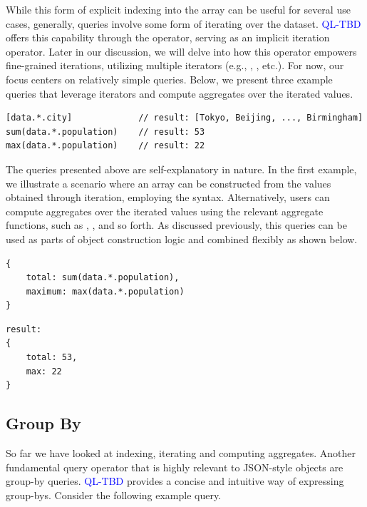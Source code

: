 \documentclass[runningheads]{llncs}
\newcommand{\lang}{\textcolor{blue}{QL-TBD}}
\begin{document}
While this form of explicit indexing into the array can be useful for several
use cases, generally, queries involve some form of iterating over the dataset.
\lang{} offers this capability through the \inline{*} operator,
serving as an implicit iteration operator.
Later in our discussion, we will delve into how this operator empowers fine-grained
iterations, utilizing multiple iterators
(e.g., , , etc.).
For now, our focus centers on relatively simple queries.
Below, we present three example queries that leverage iterators and compute
aggregates over the iterated values.

\begin{lstlisting}[style=JavaScript, columns=flexible]
[data.*.city]             // result: [Tokyo, Beijing, ..., Birmingham]
sum(data.*.population)    // result: 53
max(data.*.population)    // result: 22
\end{lstlisting}

The queries presented above are self-explanatory in nature.
In the first example, we illustrate a scenario where an array can be constructed
from the values obtained through iteration, employing the \inline{[...]} syntax.
Alternatively, users can compute aggregates over the iterated values using the
relevant aggregate functions, such as , , and so forth.
As discussed previously, this queries can be used as parts of object
construction logic and combined flexibly as shown below.

\begin{minipage}{0.5\textwidth}
\begin{lstlisting}[style=JavaScript, columns=flexible, numbers=none]
{
    total: sum(data.*.population),
    maximum: max(data.*.population)
}
\end{lstlisting}
\end{minipage}

\begin{minipage}{0.5\textwidth}
\begin{lstlisting}[style=JSComment, columns=flexible, numbers=none]
result: 
{
    total: 53,
    max: 22
}
\end{lstlisting}
\end{minipage}


\subsection{Group By}
So far we have looked at indexing, iterating and computing aggregates.
Another fundamental query operator that is highly relevant to JSON-style
objects are group-by queries.
\lang{} provides a concise and intuitive way of expressing group-bys.
Consider the following example query.
\end{document}
